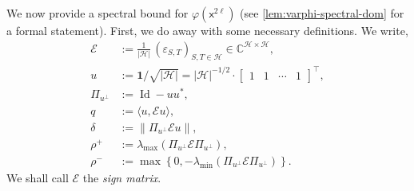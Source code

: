 \documentclass
[11pt,letterpaper]
{article}
\theoremstyle{definition}
\newcommand{\sfx}{\mathsf x}
\newcommand{\eps}{\varepsilon}
\newcommand{\cE}{{\mathcal E}}
\newcommand{\1}{\mathbf{1}}
\newcommand{\C}{\mathbb C}
\newcommand{\cH}{\mathcal H}
\newcommand{\Id}{\operatorname{Id}}
\begin{document}
We now provide a spectral bound for $\varphi(\sfx^{2\ell})$ (see \cref{lem:varphi-spectral-dom} for a formal statement). First, we do away with some necessary definitions. We write, 
\begin{align}\label{eq:spectral-notation-def}
\cE&:=\frac1{|\cH|}\,(\eps_{S,T})_{S,T\in\cH}\in\C^{\cH\times\cH},\\
u&:= \1/\sqrt{|\cH|} = |\cH|^{-1/2}\cdot\begin{bmatrix}1 & 1 & \cdots & 1\end{bmatrix}^\top,\\
\Pi_{u^\perp}&:= \Id - uu^*,\\
q&:=\langle u,\cE u\rangle,\\
\delta&:=\|\Pi_{u^\perp}\cE u\|,\\
\rho^+&:=\lambda_{\max}\!\left(\Pi_{u^\perp}\cE\Pi_{u^\perp}\right),\\
\rho^-&:=\max\left\{0, -\lambda_{\min}\!\left(\Pi_{u^\perp}\cE\Pi_{u^\perp}\right)\right\}.
\end{align}
We shall call $\cE$ the \emph{sign matrix}. 
\end{document}
